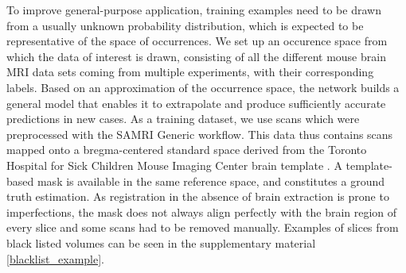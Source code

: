 To improve general-purpose application, training examples need to be drawn from a usually unknown probability distribution, which is expected to be representative of the space of occurrences.
We set up an occurence space from which the data of interest is drawn, consisting of all the different mouse brain MRI data sets coming from multiple experiments, with their corresponding labels.
Based on an approximation of the occurrence space, the network builds a general model that enables it to extrapolate and produce sufficiently accurate predictions in new cases.
As a training dataset, we use scans which were preprocessed with the SAMRI \cite{noauthor_ibt-fmi/samri_2019} Generic workflow.
This data thus contains scans mapped onto a bregma-centered standard \cite{ioanas_optimized_2019} space derived from the Toronto Hospital for Sick Children Mouse Imaging Center brain template \cite{dsu}.
A template-based mask is available in the same reference space, and constitutes a ground truth estimation.
As registration in the absence of brain extraction is prone to imperfections, the mask does not always align perfectly with the brain region of every slice and some scans had to be removed manually.
Examples of slices from black listed volumes can be seen in the supplementary material \cref{blacklist_example}.
